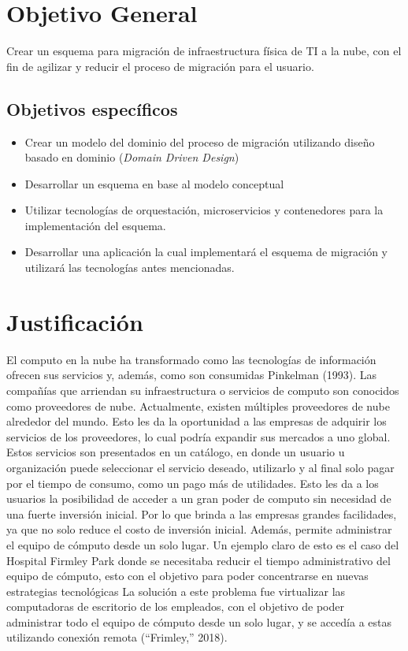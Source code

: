 \documentclass[12pt,twoside]{reedthesis}
\theoremstyle{definition}
\theoremstyle{definition}
\theoremstyle{definition}
\theoremstyle{remark}
\begin{document}
\hypertarget{objetivo-general}{%
\section{Objetivo General}\label{objetivo-general}}

Crear un esquema para migración de infraestructura física de TI a la
nube, con el fin de agilizar y reducir el proceso de migración para el
usuario.

\hypertarget{objetivos-especificos}{%
\subsection{Objetivos específicos}\label{objetivos-especificos}}
\begin{itemize}
\item
  Crear un modelo del dominio del proceso de migración utilizando diseño
  basado en dominio (\emph{Domain Driven Design})
\item
  Desarrollar un esquema en base al modelo conceptual
\item
  Utilizar tecnologías de orquestación, microservicios y contenedores
  para la implementación del esquema.
\item
  Desarrollar una aplicación la cual implementará el esquema de
  migración y utilizará las tecnologías antes mencionadas.
\end{itemize}
\hypertarget{justificacion}{%
\section{Justificación}\label{justificacion}}

El computo en la nube ha transformado como las tecnologías de
información ofrecen sus servicios y, además, como son consumidas
Pinkelman (1993). Las compañías que arriendan su infraestructura o
servicios de computo son conocidos como proveedores de nube.
Actualmente, existen múltiples proveedores de nube alrededor del mundo.
Esto les da la oportunidad a las empresas de adquirir los servicios de
los proveedores, lo cual podría expandir sus mercados a uno global.
Estos servicios son presentados en un catálogo, en donde un usuario u
organización puede seleccionar el servicio deseado, utilizarlo y al
final solo pagar por el tiempo de consumo, como un pago más de
utilidades. Esto les da a los usuarios la posibilidad de acceder a un
gran poder de computo sin necesidad de una fuerte inversión inicial. Por
lo que brinda a las empresas grandes facilidades, ya que no solo reduce
el costo de inversión inicial. Además, permite administrar el equipo de
cómputo desde un solo lugar. Un ejemplo claro de esto es el caso del
Hospital Firmley Park donde se necesitaba reducir el tiempo
administrativo del equipo de cómputo, esto con el objetivo para poder
concentrarse en nuevas estrategias tecnológicas La solución a este
problema fue virtualizar las computadoras de escritorio de los
empleados, con el objetivo de poder administrar todo el equipo de
cómputo desde un solo lugar, y se accedía a estas utilizando conexión
remota (``Frimley,'' 2018).
\end{document}
